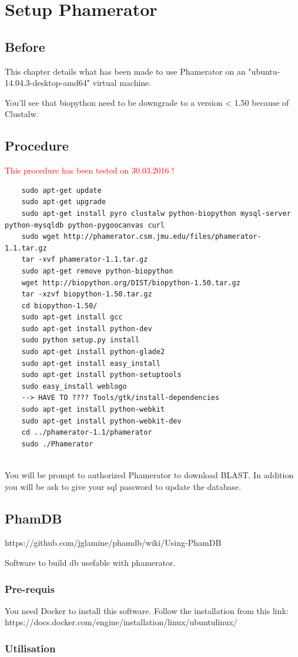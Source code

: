 \documentclass[a4paper,11pt]{report}
\begin{document}
\tableofcontents


\chapter{Setup Phamerator}
\section{Before}

This chapter details what has been made to use Phamerator on an "ubuntu-14.04.3-desktop-amd64" virtual machine.

You'll see that biopython need to be downgrade to a version < 1.50 because of Clustalw. 


\section{Procedure}

\textcolor{red}{This procedure has been tested on 30.03.2016 !}

\begin{verbatim}
	sudo apt-get update
	sudo apt-get upgrade
	sudo apt-get install pyro clustalw python-biopython mysql-server python-mysqldb python-pygoocanvas curl
	sudo wget http://phamerator.csm.jmu.edu/files/phamerator-1.1.tar.gz
	tar -xvf phamerator-1.1.tar.gz
	sudo apt-get remove python-biopython
	wget http://biopython.org/DIST/biopython-1.50.tar.gz
	tar -xzvf biopython-1.50.tar.gz 
	cd biopython-1.50/
	sudo apt-get install gcc
	sudo apt-get install python-dev 
	sudo python setup.py install
	sudo apt-get install python-glade2 
	sudo apt-get install easy_install
	sudo apt-get install python-setuptools
	sudo easy_install weblogo
	--> HAVE TO ???? Tools/gtk/install-dependencies
	sudo apt-get install python-webkit
	sudo apt-get install python-webkit-dev
	cd ../phamerator-1.1/phamerator 
	sudo ./Phamerator 
   
\end{verbatim}

You will be prompt to authorized Phamerator to download BLAST. In addition you will be ask to give your sql password to update the database.

\section{PhamDB}
https://github.com/jglamine/phamdb/wiki/Using-PhamDB

Software to build db usefable with phamerator.

\subsection{Pre-requis}
You need Docker to install this software. Follow the installation from this link: https://docs.docker.com/engine/installation/linux/ubuntulinux/ 

\subsection{Utilisation}
\end{document}
